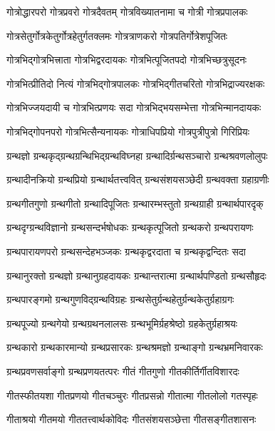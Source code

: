 \twolineshloka
{गोत्रोद्धारपरो गोत्रप्रवरो गोत्रदैवतम्}%
{गोत्रविख्यातनामा च गोत्री गोत्रप्रपालकः}%

\twolineshloka
{गोत्रसेतुर्गोत्रकेतुर्गोत्रहेतुर्गतक्लमः}%
{गोत्रत्राणकरो गोत्रपतिर्गोत्रेशपूजितः}%

\twolineshloka
{गोत्रभिद्गोत्रभित्त्राता गोत्रभिद्वरदायकः}%
{गोत्रभित्पूजितपदो गोत्रभिच्छत्रुसूदनः}%

\twolineshloka
{गोत्रभित्प्रीतिदो नित्यं गोत्रभिद्गोत्रपालकः}%
{गोत्रभिद्गीतचरितो गोत्रभिद्राज्यरक्षकः}%

\twolineshloka
{गोत्रभिज्जयदायी च गोत्रभित्प्रणयः सदा}%
{गोत्रभिद्भयसम्भेत्ता गोत्रभिन्मानदायकः}%

\twolineshloka
{गोत्रभिद्गोपनपरो गोत्रभित्सैन्यनायकः}%
{गोत्राधिपप्रियो गोत्रपुत्रीपुत्रो गिरिप्रियः}%

\twolineshloka
{ग्रन्थज्ञो ग्रन्थकृद्ग्रन्थग्रन्थिभिद्ग्रन्थविघ्नहा}%
{ग्रन्थादिर्ग्रन्थसञ्चारो ग्रन्थश्रवणलोलुपः}%

\twolineshloka
{ग्रन्थादीनक्रियो ग्रन्थप्रियो ग्रन्थार्थतत्त्ववित्}%
{ग्रन्थसंशयसञ्छेदी ग्रन्थवक्ता ग्रहाग्रणीः}%

\twolineshloka
{ग्रन्थगीतगुणो ग्रन्थगीतो ग्रन्थादिपूजितः}%
{ग्रन्थारम्भस्तुतो ग्रन्थग्राही ग्रन्थार्थपारदृक्}%

\twolineshloka
{ग्रन्थदृग्ग्रन्थविज्ञानो ग्रन्थसन्दर्भषोधकः}%
{ग्रन्थकृत्पूजितो ग्रन्थकरो ग्रन्थपरायणः}%

\twolineshloka
{ग्रन्थपारायणपरो ग्रन्थसन्देहभञ्जकः}%
{ग्रन्थकृद्वरदाता च ग्रन्थकृद्वन्दितः सदा}%

\twolineshloka
{ग्रन्थानुरक्तो ग्रन्थज्ञो ग्रन्थानुग्रहदायकः}%
{ग्रन्थान्तरात्मा ग्रन्थार्थपण्डितो ग्रन्थसौहृदः}%

\twolineshloka
{ग्रन्थपारङ्गमो ग्रन्थगुणविद्ग्रन्थविग्रहः}%
{ग्रन्थसेतुर्ग्रन्थहेतुर्ग्रन्थकेतुर्ग्रहाग्रगः}%

\twolineshloka
{ग्रन्थपूज्यो ग्रन्थगेयो ग्रन्थग्रथनलालसः}%
{ग्रन्थभूमिर्ग्रहश्रेष्ठो ग्रहकेतुर्ग्रहाश्रयः}%

\twolineshloka
{ग्रन्थकारो ग्रन्थकारमान्यो ग्रन्थप्रसारकः}%
{ग्रन्थश्रमज्ञो ग्रन्थाङ्गो ग्रन्थभ्रमनिवारकः}%

\twolineshloka
{ग्रन्थप्रवणसर्वाङ्गो ग्रन्थप्रणयतत्परः}%
{गीतं गीतगुणो गीतकीर्तिर्गीतविशारदः}%

\twolineshloka
{गीतस्फीतयशा गीतप्रणयो गीतचञ्चुरः}%
{गीतप्रसन्नो गीतात्मा गीतलोलो गतस्पृहः}%

\twolineshloka
{गीताश्रयो गीतमयो गीततत्त्वार्थकोविदः}%
{गीतसंशयसञ्छेत्ता गीतसङ्गीतशासनः}%

